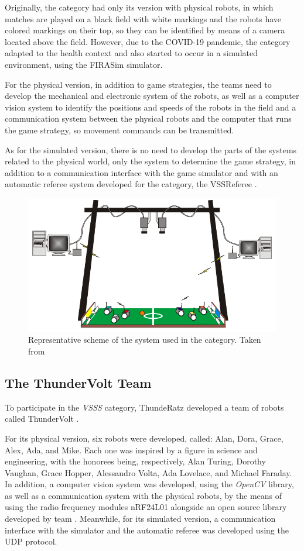 Originally, the category had only its version with physical robots, in which matches are played on a black field with white markings and the robots have colored markings on their top, so they can be identified by means of a camera located above the field. However, due to the COVID-19 pandemic, the category adapted to the health context and also started to occur in a simulated environment, using the FIRASim \cite{FIRASim} simulator.

For the physical version, in addition to game strategies, the teams need to develop the mechanical and electronic system of the robots, as well as a computer vision system to identify the positions and speeds of the robots in the field and a communication system between the physical robots and the computer that runs the game strategy, so movement commands can be transmitted.

As for the simulated version, there is no need to develop the parts of the systems related to the physical world, only the system to determine the game strategy, in addition to a communication interface with the game simulator and with an automatic referee system developed for the category, the VSSReferee \cite{VSSReferee}.

\begin{figure}[!h]
    \centering
    \includegraphics[width=.7\linewidth]{chapters/introduction/images/General System.png}
    \caption{Representative scheme of the system used in the category. Taken from \cite{FutRobosFerramentaDeEnsino}}
    \label{fig:general_system}
\end{figure}

\subsection{The ThunderVolt Team}

To participate in the \textit{VSSS} category, ThundeRatz developed a team of robots called ThunderVolt \cite{ThunderVolt, TDPThunderVolt}.

For its physical version, six robots were developed, called: Alan, Dora, Grace, Alex, Ada, and Mike. Each one was inspired by a figure in science and engineering, with the honorees being, respectively, Alan Turing, Dorothy Vaughan, Grace Hopper, Alessandro Volta, Ada Lovelace, and Michael Faraday. In addition, a computer vision system was developed, using the \textit{OpenCV} \cite{OpenCV} library, as well as a communication system with the physical robots, by the means of using the radio frequency modules nRF24L01 alongside an open source library developed by team \cite{STM3232RF24}. Meanwhile, for its simulated version, a communication interface with the simulator and the automatic referee was developed using the UDP protocol.

